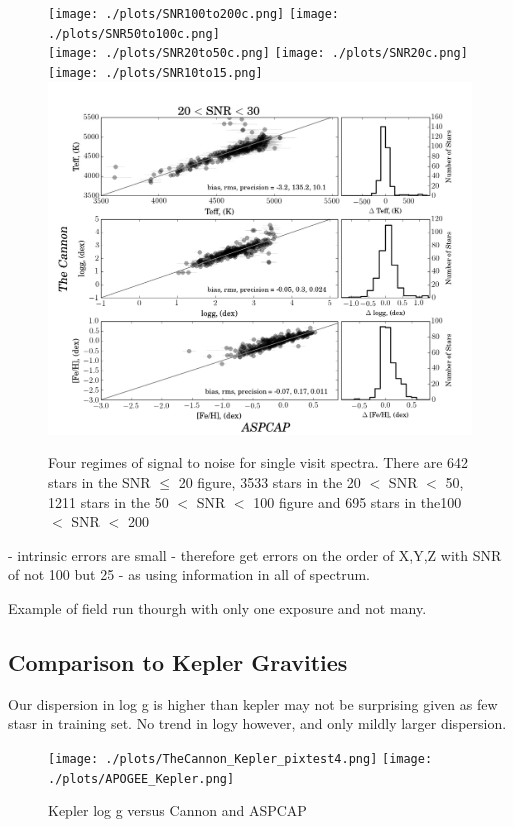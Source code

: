 \documentclass[12pt, preprint]{aastex}
\begin{document}
 \begin{figure}[h!]
 \texttt{[image: ./plots/SNR100to200c.png]}
\texttt{[image: ./plots/SNR50to100c.png]}\\
\texttt{[image: ./plots/SNR20to50c.png]}
\texttt{[image: ./plots/SNR20c.png]}\\
\texttt{[image: ./plots/SNR10to15.png]}
\includegraphics[scale=0.24]{./plots/SNR20to30.png}
  \caption{Four regimes of signal to noise for single visit spectra. There are 642 stars in the SNR $\le$ 20 figure, 3533 stars in the 20 $<$ SNR $<$ 50, 1211 stars in the 50 $<$ SNR $<$ 100 figure and 695 stars in the100 $<$  SNR $<$ 200}
\label{fig:SNR}
\end{figure}

- intrinsic errors are small 
- therefore get errors on the order of X,Y,Z with SNR of not 100 but 25 - as using information in all of spectrum. 

Example of field run thourgh with only one exposure and not many. 


\subsection{Comparison to Kepler Gravities}

Our dispersion in log g is higher than kepler may not be surprising given as few stasr in training set. 
No trend in logy however, and only mildly larger dispersion. 

  \begin{figure}[h!]
 \texttt{[image: ./plots/TheCannon\_Kepler\_pixtest4.png]}
  \texttt{[image: ./plots/APOGEE\_Kepler.png]}
 \caption{Kepler log g versus Cannon and ASPCAP}
\label{fig:kepler}
\end{figure}
\end{document}
